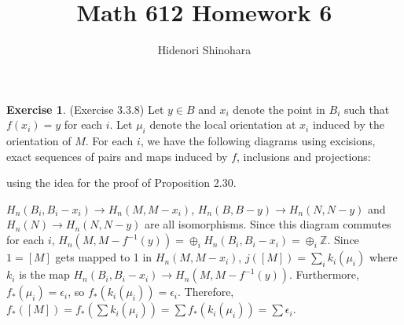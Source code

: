 \documentclass[12pt, psamsfonts]{amsart}
\theoremstyle{definition}
\newtheorem*{exer}{Exercise}
\theoremstyle{remark}
\numberwithin{equation}{section}
\begin{document}
\title{Math 612 Homework 6}
\author{Hidenori Shinohara}
\maketitle

% 
% 
\begin{exer}{(Exercise 3.3.8)}
  Let $y \in B$ and $x_i$ denote the point in $B_i$ such that $f(x_i) = y$ for each $i$.
  Let $\mu_i$ denote the local orientation at $x_i$ induced by the orientation of $M$.
  For each $i$, we have the following diagrams using excisions, exact sequences of pairs and maps induced by $f$, inclusions and projections:
  \begin{center}
  \end{center}
  using the idea for the proof of Proposition 2.30.

  $H_n(B_i, B_i - x_i) \rightarrow H_n(M, M - x_i)$, $H_n(B, B - y) \rightarrow H_n(N, N - y)$ and $H_n(N) \rightarrow H_n(N, N - y)$ are all isomorphisms.
  Since this diagram commutes for each $i$, $H_n(M, M - f^{-1}(y)) = \oplus_{i} H_n(B_i, B_i - x_i) = \oplus_{i} \mathbb{Z}$.
  Since $1 = [M]$ gets mapped to 1 in $H_n(M, M - x_i)$, $j([M]) = \sum_i k_i(\mu_i)$ where $k_i$ is the map $H_n(B_i, B_i - x_i) \rightarrow H_n(M, M - f^{-1}(y))$.
  Furthermore, $f_{\ast}(\mu_i) = \epsilon_i$, so $f_{\ast}(k_i(\mu_i)) = \epsilon_i$.
  Therefore, $f_{\ast}([M]) = f_{\ast}(\sum k_i(\mu_i)) = \sum f_{\ast}(k_i(\mu_i)) = \sum \epsilon_i$.
\end{exer}
\end{document}
